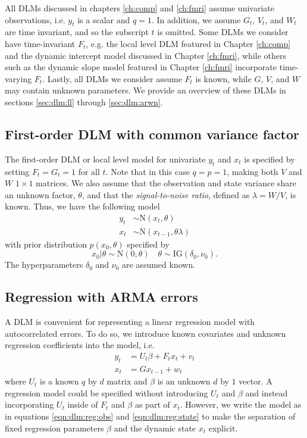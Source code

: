 All DLMs discussed in chapters \ref{ch:comp} and \ref{ch:fmri} assume univariate observations, i.e. $y_t$ is a scalar and $q = 1$. In addition, we assume $G_t$, $V_t$, and $W_t$ are time invariant, and so the subscript $t$ is omitted. Some DLMs we consider have time-invariant $F_t$, e.g. the local level DLM featured in Chapter \ref{ch:comp} and the dynamic intercept model discussed in Chapter \ref{ch:fmri}, while others such as the dynamic slope model featured in Chapter \ref{ch:fmri} incorporate time-varying $F_t$. Lastly, all DLMs we consider assume $F_t$ is known, while $G$, $V$, and $W$ may contain unknown parameters. We provide an overview of these DLMs in sections \ref{sec:dlm:ll} through \ref{sec:dlm:arwn}.

\subsection{First-order DLM with common variance factor \label{sec:dlm:ll}}

The first-order DLM or local level model for univariate $y_t$ and $x_t$ is specified by setting $F_t = G_t = 1$ for all $t$. Note that in this case $q = p = 1$, making both $V$ and $W$ $1 \times 1$ matrices. We also assume that the observation and state variance share an unknown factor, $\theta$, and that the \emph{signal-to-noise ratio}, defined as $\lambda = W / V$, is known. Thus, we have the following model
\begin{align}
y_t &\sim \mbox{N}(x_t, \theta) \label{eqn:ll:obs} \\
x_t &\sim \mbox{N}(x_{t-1}, \theta\lambda) \label{eqn:ll:state}
\end{align}
with prior distribution $p(x_0, \theta)$ specified by
\begin{equation}
x_0|\theta \sim \mbox{N}(0, \theta) \quad \theta \sim \mbox{IG}(\delta_0,\nu_0). \label{eqn:ll:prior}
\end{equation}
The hyperparameters $\delta_0$ and $\nu_0$ are assumed known.

\subsection{Regression with ARMA errors \label{sec:dlm:arma}}

A DLM is convenient for representing a linear regression model with autocorrelated errors. To do so, we introduce known covariates and unknown regression coefficients into the model, i.e.
\begin{align}
y_t &= U_t\beta + F_tx_t + v_t \label{eqn:dlm:reg:obs} \\
x_t &= Gx_{t-1} + w_t \label{eqn:dlm:reg:state}
\end{align}
where $U_t$ is a known $q$ by $d$ matrix and $\beta$ is an unknown $d$ by $1$ vector. A regression model could be specified without introducing $U_t$ and $\beta$ and instead incorporating $U_t$ inside of $F_t$ and $\beta$ as part of $x_t$. However, we write the model as in equations \eqref{eqn:dlm:reg:obs} and \eqref{eqn:dlm:reg:state} to make the separation of fixed regression parameters $\beta$ and the dynamic state $x_t$ explicit.

